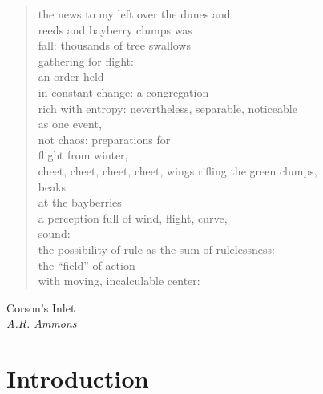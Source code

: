 \epigraph{\begin{verse}
\hspace*{1em} the news to my left over the dunes and\\
reeds and bayberry clumps was\\
\hspace*{1em} fall: thousands of tree swallows\\
\hspace*{1em}  gathering for flight:\\
\hspace*{1em}  an order held\\
\hspace*{1em}  in constant change: a congregation\\
rich with entropy: nevertheless, separable, noticeable\\
\hspace*{1em}  as one event,\\
\hspace*{2em} not chaos: preparations for\\
flight from winter,\\
cheet, cheet, cheet, cheet, wings rifling the green clumps,\\
beaks\\
at the bayberries\\
\hspace*{.5em} a perception full of wind, flight, curve,\\
\hspace*{.5em} sound:\\
\hspace*{.5em} the possibility of rule as the sum of rulelessness:\\
the “field” of action\\
with moving, incalculable center:\end{verse}}{Corson's Inlet\\ \textit{A.R. Ammons}}

\chapter{Introduction}
\label{chap:intro}


